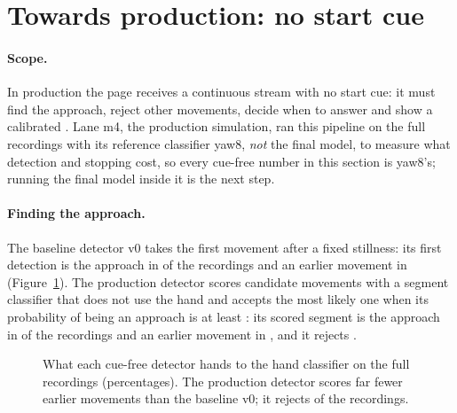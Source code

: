 \section{Towards production: no start cue}\label{sec:production}

\paragraph{Scope.} In production the page receives a continuous stream with no start cue: it must find the approach,
reject other movements, decide when to answer and show a calibrated \pright{}. Lane m4, the production simulation,
ran this pipeline on the full recordings with its reference classifier yaw8, \emph{not} the final model, to measure
what detection and stopping cost, so every cue-free number in this section is yaw8's; running the final model inside
it is the next step.

\paragraph{Finding the approach.} The baseline detector v0 takes the first movement after a fixed stillness: its
first detection is the approach in  of the recordings and an earlier movement in
 (Figure~\ref{fig:M4_01_detection_outcomes}). The production detector
scores candidate movements with a segment classifier that does not use the hand and accepts the most likely one when
its probability of being an approach is at least : its scored segment is the approach in
 of the recordings and an earlier movement in , and it
rejects .

\begin{figure}[htbp]
\centering
{}
\caption{What each cue-free detector hands to the hand classifier on the  full recordings
(percentages). The production detector scores far fewer earlier movements than the baseline v0; it rejects
 of the recordings.}
\label{fig:M4_01_detection_outcomes}
\end{figure}

